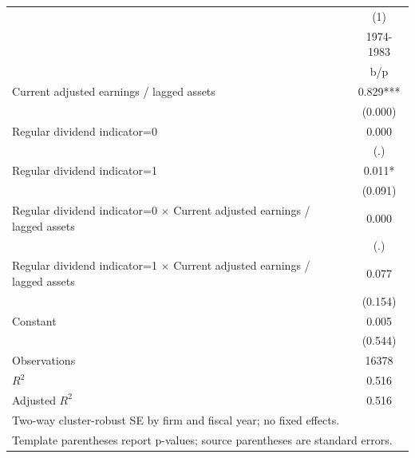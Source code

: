 {
\def\sym#1{\ifmmode^{#1}\else\(^{#1}\)\fi}
\begin{tabular}{l*{1}{c}}
\hline\hline
                    &\multicolumn{1}{c}{(1)}\\
                    &\multicolumn{1}{c}{1974-1983}\\
                    &         b/p   \\
\hline
Current adjusted earnings / lagged assets&       0.829***\\
                    &     (0.000)   \\
Regular dividend indicator=0&       0.000   \\
                    &         (.)   \\
Regular dividend indicator=1&       0.011*  \\
                    &     (0.091)   \\
Regular dividend indicator=0 $\times$ Current adjusted earnings / lagged assets&       0.000   \\
                    &         (.)   \\
Regular dividend indicator=1 $\times$ Current adjusted earnings / lagged assets&       0.077   \\
                    &     (0.154)   \\
Constant            &       0.005   \\
                    &     (0.544)   \\
\hline
Observations        &       16378   \\
\(R^{2}\)           &       0.516   \\
Adjusted \(R^{2}\)  &       0.516   \\
\hline\hline
\multicolumn{2}{l}{\footnotesize Two-way cluster-robust SE by firm and fiscal year; no fixed effects.}\\
\multicolumn{2}{l}{\footnotesize Template parentheses report p-values; source parentheses are standard errors.}\\
\end{tabular}
}
